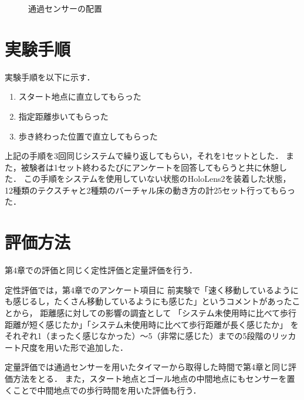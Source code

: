 \begin{figure}[H]
    \centering
    \caption{通過センサーの配置}
    \label{fig:13}
\end{figure}



\section{実験手順}
実験手順を以下に示す．
\begin{enumerate}
    \item スタート地点に直立してもらった
    \item 指定距離歩いてもらった
    \item 歩き終わった位置で直立してもらった
\end{enumerate}
上記の手順を3回同じシステムで繰り返してもらい，それを1セットとした．
また，被験者は1セット終わるたびにアンケートを回答してもらうと共に休憩した．
この手順をシステムを使用していない状態のHoloLens2を装着した状態，
12種類のテクスチャと2種類のバーチャル床の動き方の計25セット行ってもらった．

\section{評価方法}
第4章での評価と同じく定性評価と定量評価を行う．


定性評価では，第4章でのアンケート項目に
前実験で「速く移動しているようにも感じるし，たくさん移動しているようにも感じた」というコメントがあったことから，
距離感に対しての影響の調査として
「システム未使用時に比べて歩行距離が短く感じたか」「システム未使用時に比べて歩行距離が長く感じたか」
をそれぞれ1（まったく感じなかった）～5（非常に感じた）までの5段階のリッカート尺度を用いた形で追加した．


定量評価では通過センサーを用いたタイマーから取得した時間で第4章と同じ評価方法をとる．
また，スタート地点とゴール地点の中間地点にもセンサーを置くことで中間地点での歩行時間を用いた評価も行う．
